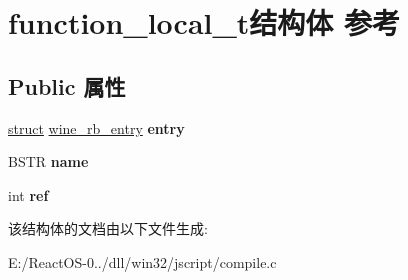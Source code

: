 \hypertarget{structfunction__local__t}{}\section{function\+\_\+local\+\_\+t结构体 参考}
\label{structfunction__local__t}
\subsection*{Public 属性}
\begin{DoxyCompactItemize}
\item 
\mbox{\label{structfunction__local__t_a911794b8e2c29744f576cde5c6d345c4}} 
\hyperlink{interfacestruct}{struct} \hyperlink{structwine__rb__entry}{wine\+\_\+rb\+\_\+entry} {\bfseries entry}
\item 
\mbox{\label{structfunction__local__t_acf499b53705b9692c7f996a491f4b283}} 
B\+S\+TR {\bfseries name}
\item 
\mbox{\label{structfunction__local__t_ad11560d7a67c6fa2669c77e4591827e4}} 
int {\bfseries ref}
\end{DoxyCompactItemize}


该结构体的文档由以下文件生成\+:\begin{DoxyCompactItemize}
\item 
E\+:/\+React\+O\+S-\/0../dll/win32/jscript/compile.\+c\end{DoxyCompactItemize}
